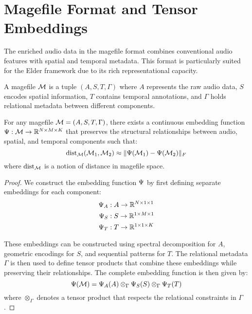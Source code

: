 \section{Magefile Format and Tensor Embeddings}

The enriched audio data in the magefile format combines conventional audio features with spatial and temporal metadata. This format is particularly suited for the Elder framework due to its rich representational capacity.

\begin{definition}
A magefile $\mathcal{M}$ is a tuple $(A, S, T, \Gamma)$ where $A$ represents the raw audio data, $S$ encodes spatial information, $T$ contains temporal annotations, and $\Gamma$ holds relational metadata between different components.
\end{definition}

\begin{theorem}
For any magefile $\mathcal{M} = (A, S, T, \Gamma)$, there exists a continuous embedding function $\Psi: \mathcal{M} \rightarrow \mathbb{R}^{N \times M \times K}$ that preserves the structural relationships between audio, spatial, and temporal components such that:
\begin{equation}
\mathrm{dist}_{\mathcal{M}}(\mathcal{M}_1, \mathcal{M}_2) \approx \| \Psi(\mathcal{M}_1) - \Psi(\mathcal{M}_2) \|_F
\end{equation}
where $\mathrm{dist}_{\mathcal{M}}$ is a notion of distance in magefile space.
\end{theorem}

\begin{proof}
We construct the embedding function $\Psi$ by first defining separate embeddings for each component:
\begin{align*}
\Psi_A &: A \rightarrow \mathbb{R}^{N \times 1 \times 1} \\
\Psi_S &: S \rightarrow \mathbb{R}^{1 \times M \times 1} \\
\Psi_T &: T \rightarrow \mathbb{R}^{1 \times 1 \times K} \\
\end{align*}

These embeddings can be constructed using spectral decomposition for $A$, geometric encodings for $S$, and sequential patterns for $T$. The relational metadata $\Gamma$ is then used to define tensor products that combine these embeddings while preserving their relationships. The complete embedding function is then given by:
\begin{equation}
\Psi(\mathcal{M}) = \Psi_A(A) \otimes_{\Gamma} \Psi_S(S) \otimes_{\Gamma} \Psi_T(T)
\end{equation}
where $\otimes_{\Gamma}$ denotes a tensor product that respects the relational constraints in $\Gamma$.
\end{proof}


